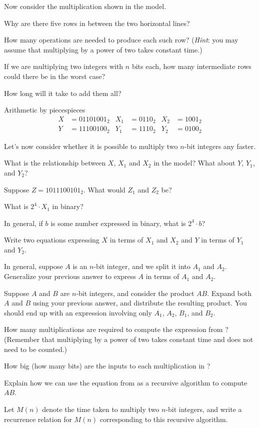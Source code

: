 \documentclass{tufte-handout}
\begin{document}
Now consider the multiplication shown in the model.

\begin{questions}
\item Why are there five rows in between the two horizontal lines?
\item How many operations are needed to produce each such row?
  (\emph{Hint}: you may assume that multiplying by a power of two
  takes constant time.)
\item If we are multiplying two integers with $n$ bits each, how many
  intermediate rows could there be in the worst case?
\item How long will it take to add them all?
\end{questions}

\pause

\begin{model*}{Arithmetic by pieces}{pieces}
  \begin{align*}
    X &= 01101001_2 & X_1 &= 0110_2 & X_2 &= 1001_2 \\
    Y &= 11100100_2 & Y_1 &= 1110_2 & Y_2 &= 0100_2
  \end{align*}
\end{model*}

Let's now consider whether it is possible to multiply two $n$-bit
integers any faster.

\begin{questions}
\item What is the relationship between $X$, $X_1$ and $X_2$ in the
  model?  What about $Y$, $Y_1$, and $Y_2$?
\item Suppose $Z = 1011100101_2$.  What would $Z_1$ and $Z_2$ be?
\item What is $2^4 \cdot X_1$ in binary?
\item In general, if $b$ is some number expressed in binary, what is
  $2^4 \cdot b$?
\item Write two equations expressing $X$ in terms of $X_1$ and $X_2$
  and $Y$ in terms of $Y_1$ and $Y_2$.
\item In general, suppose $A$ is an $n$-bit integer, and we split it
  into $A_1$ and $A_2$.  Generalize your previous answer to express
  $A$ in terms of $A_1$ and $A_2$.
\newpage
\item \label{q:expr} Suppose $A$ and $B$ are $n$-bit integers, and consider the
  product $AB$. Expand both $A$ and $B$ using your previous answer,
  and distribute the resulting product.  You should end up with an
  expression involving only $A_1$, $A_2$, $B_1$, and $B_2$.
\item How many multiplications are required to compute the expression
  from ? (Remember that multiplying by a power of two
  takes constant time and does not need to be counted.)
\item How big (how many bits) are the inputs to each multiplication in
  ?
\item Explain how we can use the equation from  as a recursive
  algorithm to compute $AB$.
\item Let $M(n)$ denote the time taken to multiply two $n$-bit
  integers, and write a recurrence relation for $M(n)$ corresponding
  to this recursive algorithm.
\end{questions}
\end{document}
